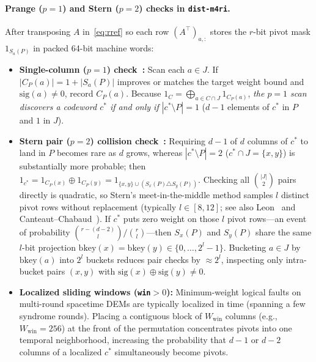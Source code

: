 \documentclass[12pt]{article}
\theoremstyle{definition}
\newcommand{\ttt}[1]{\texttt{#1}}
\begin{document}
\paragraph{Prange ($p = 1$) and Stern ($p = 2$) checks in \ttt{dist-m4ri}.}
After transposing $A$ in~\eqref{eq:rref} so each row $(A^\top)_{a, :}$ stores the $r$-bit pivot mask $1_{S_a(P)}$
in packed 64-bit machine words:
\begin{itemize}
  \item \textbf{Single-column ($p = 1$) check~\cite{Prange1962,PryadkoShabashovKozin2022QDistRnd}:} Scan each $a
    \in J$. If $|C_P(a)| = 1 + |S_a(P)|$ improves or matches the target weight bound and $\mathrm{sig}(a) \neq 0$,
    record $C_P(a)$. Because $1_C = \bigoplus_{a \in C \cap J} 1_{C_P(a)}$, \emph{the $p = 1$ scan discovers a
    codeword $c^*$ if and only if $|c^* \setminus P| = 1$} ($d - 1$ elements of $c^*$ in $P$ and $1$ in $J$).
  \item \textbf{Stern pair ($p = 2$) collision check~\cite{Stern1988,Leon1988}:} Requiring $d - 1$ of $d$ columns
    of $c^*$ to land in $P$ becomes rare as $d$ grows, whereas $|c^* \setminus P| = 2$ ($c^* \cap J = \{x, y\}$) is
    substantially more probable; then $1_{c^*} = 1_{C_P(x)} \oplus 1_{C_P(y)} = 1_{\{x, y\} \cup (S_x(P) \triangle
    S_y(P))}$. Checking all $\binom{|J|}{2}$ pairs directly is quadratic, so Stern's meet-in-the-middle method
    samples $l$ distinct pivot rows without replacement (typically $l \in [8, 12]$; see also Leon~\cite{Leon1988}
    and Canteaut--Chabaud~\cite{CanteautChabaud1998}). If $c^*$ puts zero weight on those $l$ pivot rows---an event
    of probability $\binom{r - (d - 2)}{l} / \binom{r}{l}$---then $S_x(P)$ and $S_y(P)$ share the same $l$-bit
    projection $\mathrm{bkey}(x) = \mathrm{bkey}(y) \in \{0, \dots, 2^l - 1\}$. Bucketing $a \in J$ by
    $\mathrm{bkey}(a)$ into $2^l$ buckets reduces pair checks by $\approx 2^l$, inspecting only intra-bucket pairs
    $(x, y)$ with $\mathrm{sig}(x) \oplus \mathrm{sig}(y) \neq 0$.
  \item \textbf{Localized sliding windows (\ttt{win}$>0$):} Minimum-weight logical faults on multi-round spacetime
    DEMs are typically localized in time (spanning a few syndrome rounds). Placing a contiguous block of
    $W_{\mathrm{win}}$ columns (e.g., $W_{\mathrm{win}} = 256$) at the front of the permutation concentrates pivots
    into one temporal neighborhood, increasing the probability that $d - 1$ or $d - 2$ columns of a localized $c^*$
    simultaneously become pivots.
\end{itemize}
\end{document}
